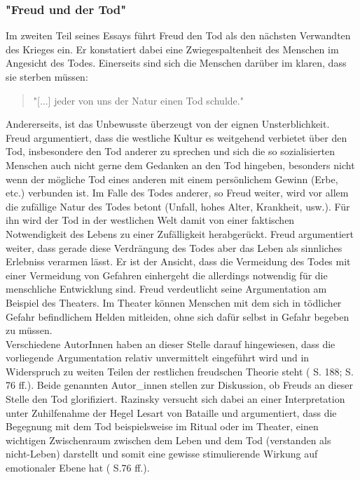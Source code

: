 \documentclass[11pt,a4paper,oneside,numbers=noenddot,bibliography=totocnumbered,DIV=13]{scrartcl}
\begin{document}
{\subsubsection{"Freud und der Tod"}
  Im zweiten Teil seines Essays führt Freud den Tod als den nächsten Verwandten des Krieges ein. Er konstatiert dabei eine Zwiegespaltenheit des Menschen im Angesicht des Todes. Einerseits sind sich die Menschen darüber im klaren, dass sie sterben müssen:
\begin{quote} "[...] jeder von uns der Natur einen Tod schulde."
\end{quote}
Andererseits, ist das Unbewusste überzeugt von der eignen Unsterblichkeit.\\
Freud argumentiert, dass die westliche Kultur es weitgehend verbietet über den Tod, insbesondere den Tod anderer zu sprechen und sich die so sozialisierten Menschen auch nicht gerne dem Gedanken an den Tod hingeben, besonders nicht wenn der mögliche Tod eines anderen mit einem persönlichem Gewinn (Erbe, etc.) verbunden ist. Im Falle des Todes anderer, so Freud weiter, wird vor allem die zufällige Natur des Todes betont (Unfall, hohes Alter, Krankheit, usw.). Für ihn wird der Tod in der westlichen Welt damit von einer faktischen Notwendigkeit des Lebens zu einer Zufälligkeit herabgerückt.
Freud argumentiert weiter, dass gerade diese Verdrängung des Todes aber das Leben als sinnliches Erlebniss verarmen lässt. Er ist der Ansicht, dass die Vermeidung des Todes mit einer Vermeidung von Gefahren einhergeht die allerdings notwendig für die menschliche Entwicklung sind. Freud verdeutlicht seine Argumentation am Beispiel des Theaters. Im Theater können Menschen mit dem sich in tödlicher Gefahr befindlichem Helden mitleiden, ohne sich dafür selbst in Gefahr begeben zu müssen. \\
Verschiedene AutorInnen haben an dieser Stelle darauf hingewiesen, dass die vorliegende Argumentation relativ unvermittelt eingeführt wird und in Widerspruch zu weiten Teilen der restlichen freudschen Theorie steht (\cite{lohmann_freud-handbuch:_2013} S. 188; \cite{liran_razinsky_how_2009} S. 76 ff.).  Beide genannten Autor\_innen stellen zur Diskussion, ob Freuds an dieser Stelle den Tod glorifiziert. Razinsky versucht sich dabei an einer Interpretation unter Zuhilfenahme der Hegel Lesart von Bataille und argumentiert, dass die Begegnung mit dem Tod beispielsweise im Ritual oder im Theater, einen wichtigen Zwischenraum zwischen dem Leben und dem Tod (verstanden als nicht-Leben) darstellt und somit eine gewisse stimulierende Wirkung auf emotionaler Ebene hat (\cite{liran_razinsky_how_2009} S.76 ff.).\\
}
\end{document}
